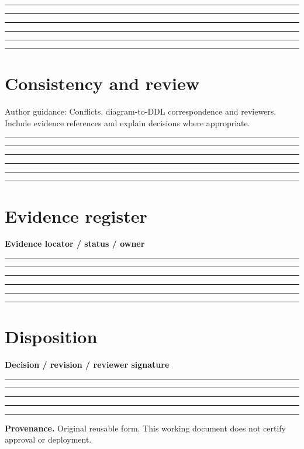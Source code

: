 \documentclass[11pt,letterpaper]{article}
\newcommand{\ResponseLine}{\par\vspace{1.05em}\noindent\rule{\linewidth}{0.4pt}\par}
\newcommand{\ResponseArea}{\ResponseLine\ResponseLine\ResponseLine}
\begin{document}
\ResponseArea\ResponseArea
\section{Consistency and review}
Author guidance: Conflicts, diagram-to-DDL correspondence and reviewers. Include evidence references and explain decisions where appropriate.


\ResponseArea\ResponseArea
\section{Evidence register}
\textbf{Evidence locator / status / owner}\ResponseArea\ResponseArea
\section{Disposition}
\textbf{Decision / revision / reviewer signature}\ResponseArea\ResponseLine
\vfill
\hrule
{\footnotesize\textbf{Provenance.} Original reusable form. This working document does not certify approval or deployment.}
\end{document}
